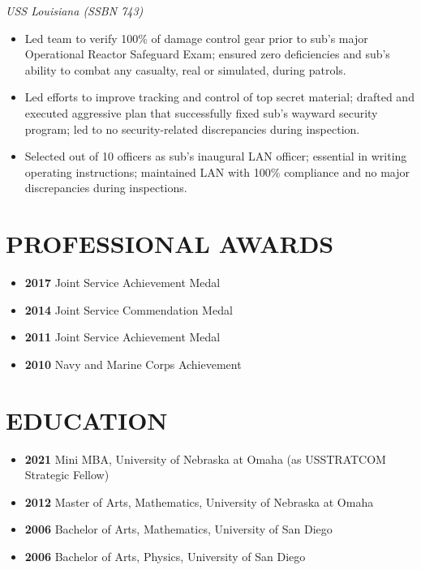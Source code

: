 \documentclass[10pt]{article}
\def\tightlist{}
\begin{document}
\emph{USS Louisiana (SSBN 743)}

\begin{itemize}
\tightlist
\item
  Led team to verify 100\% of damage control gear prior to sub's major
  Operational Reactor Safeguard Exam; ensured zero deficiencies and
  sub's ability to combat any casualty, real or simulated, during
  patrols.
\item
  Led efforts to improve tracking and control of top secret material;
  drafted and executed aggressive plan that successfully fixed sub's
  wayward security program; led to no security-related discrepancies
  during inspection.
\item
  Selected out of 10 officers as sub's inaugural LAN officer; essential
  in writing operating instructions; maintained LAN with 100\%
  compliance and no major discrepancies during inspections.
\end{itemize}

\hypertarget{professional-awards}{%
\section{PROFESSIONAL AWARDS}\label{professional-awards}}

\begin{itemize}
\tightlist
\item
  \textbf{2017} Joint Service Achievement Medal
\item
  \textbf{2014} Joint Service Commendation Medal
\item
  \textbf{2011} Joint Service Achievement Medal
\item
  \textbf{2010} Navy and Marine Corps Achievement
\end{itemize}

\hypertarget{education}{%
\section{EDUCATION}\label{education}}

\begin{itemize}
\tightlist
\item
  \textbf{2021} Mini MBA, University of Nebraska at Omaha (as USSTRATCOM
  Strategic Fellow)
\item
  \textbf{2012} Master of Arts, Mathematics, University of Nebraska at
  Omaha
\item
  \textbf{2006} Bachelor of Arts, Mathematics, University of San Diego
\item
  \textbf{2006} Bachelor of Arts, Physics, University of San Diego
\end{itemize}
\end{document}
